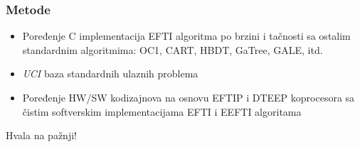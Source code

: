 \documentclass{beamer}
\begin{document}

\begin{frame}
\frametitle{Metode}
\begin{itemize}
\setlength{\itemsep}{\fill}
\item Poređenje C implementacija EFTI algoritma po brzini i tačnosti sa ostalim standardnim algoritmima: OC1, CART, HBDT, GaTree, GALE, itd.
\item \emph{UCI} baza standardnih ulaznih problema
\item Poređenje HW/SW kodizajnova na osnovu EFTIP i DTEEP koprocesora sa čistim softverskim implementacijama EFTI i EEFTI algoritama
\end{itemize}
\end{frame}


\begin{frame}
\Huge{\centerline{Hvala na pažnji!}}
\end{frame}

\end{document}
